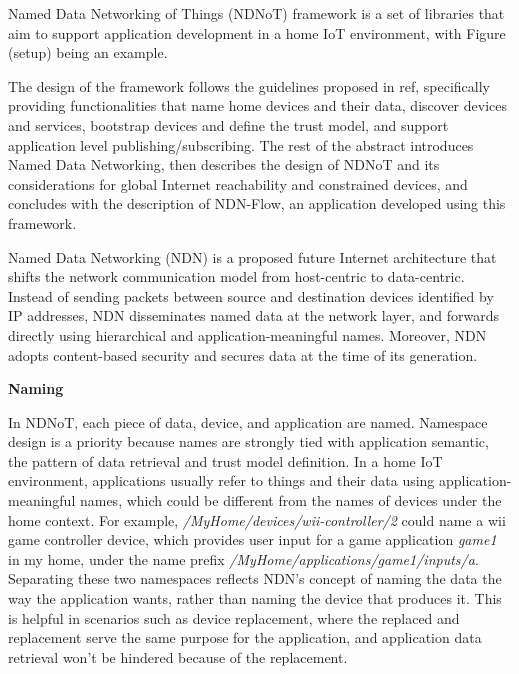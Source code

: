 \documentclass{sig-alternate-05-2015}
\begin{document}


%
%

%
%




Named Data Networking of Things (NDNoT) framework is a set of libraries that aim to support application development in a home IoT environment, with Figure (setup) being an example.

The design of the framework follows the guidelines proposed in ref, specifically providing functionalities that name home devices and their data, discover devices and services, bootstrap devices and define the trust model, and support application level publishing/subscribing. The rest of the abstract introduces Named Data Networking, then describes the design of NDNoT and its considerations for global Internet reachability and constrained devices, and concludes with the description of NDN-Flow, an application developed using this framework.

Named Data Networking (NDN) is a proposed future Internet architecture that shifts the network communication model from host-centric to data-centric. Instead of sending packets between source and destination devices identified by IP addresses, NDN disseminates named data at the network layer, and forwards directly using hierarchical and application-meaningful names. Moreover, NDN adopts content-based security and secures data at the time of its generation.

\textbf{Naming}

In NDNoT, each piece of data, device, and application are named. Namespace design is a priority because names are strongly tied with application semantic, the pattern of data retrieval and trust model definition. In a home IoT environment, applications usually refer to things and their data using application-meaningful names, which could be different from the names of devices under the home context. For example, \textit{/MyHome/devices/wii-controller/2} could name a wii game controller device, which provides user input for a game application \textit{game1} in my home, under the name prefix \textit{/MyHome/applications/game1/inputs/a}. Separating these two namespaces reflects NDN's concept of naming the data the way the application wants, rather than naming the device that produces it. This is helpful in scenarios such as device replacement, where the replaced and replacement serve the same purpose for the application, and application data retrieval won't be hindered because of the replacement.
\end{document}
